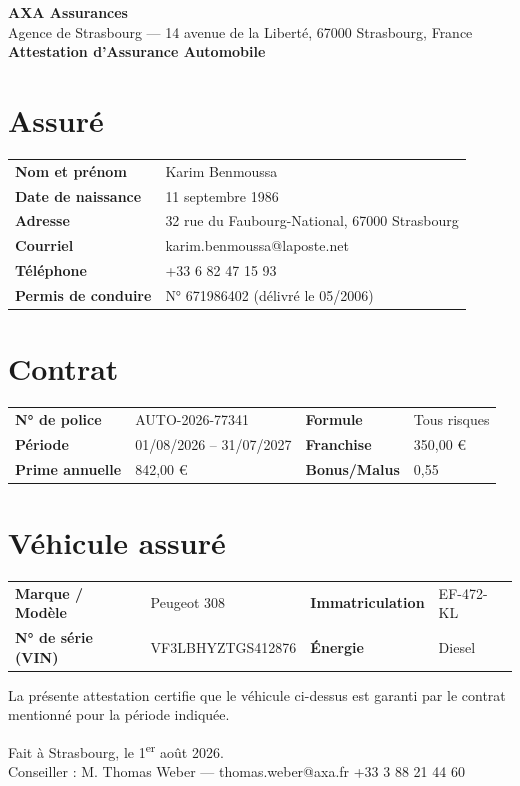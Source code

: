 \documentclass[11pt,a4paper]{article}
\begin{document}
{\Huge\bfseries\color{accent} AXA Assurances}\\[0.2em]
{\normalsize Agence de Strasbourg — 14 avenue de la Liberté, 67000 Strasbourg, France}\\[0.8em]
{\LARGE\bfseries Attestation d'Assurance Automobile}

\section{Assuré}
\begin{tabularx}{\linewidth}{@{}>{\bfseries}l X@{}}
Nom et prénom & Karim Benmoussa \\
Date de naissance & 11 septembre 1986 \\
Adresse & 32 rue du Faubourg-National, 67000 Strasbourg \\
Courriel & karim.benmoussa@laposte.net \\
Téléphone & +33 6 82 47 15 93 \\
Permis de conduire & N° 671986402 (délivré le 05/2006) \\
\end{tabularx}

\section{Contrat}
\begin{tabularx}{\linewidth}{@{}>{\bfseries}l X >{\bfseries}l X@{}}
N° de police & AUTO-2026-77341 & Formule & Tous risques \\
Période & 01/08/2026 -- 31/07/2027 & Franchise & 350,00 € \\
Prime annuelle & 842,00 € & Bonus/Malus & 0,55 \\
\end{tabularx}

\section{Véhicule assuré}
\begin{tabularx}{\linewidth}{@{}>{\bfseries}l X >{\bfseries}l X@{}}
Marque / Modèle & Peugeot 308 & Immatriculation & EF-472-KL \\
N° de série (VIN) & VF3LBHYZTGS412876 & Énergie & Diesel \\
\end{tabularx}

\vspace{1em}
La présente attestation certifie que le véhicule ci-dessus est garanti par le contrat
mentionné pour la période indiquée.

\vspace{1.2em}
Fait à Strasbourg, le 1\textsuperscript{er} août 2026.\\
Conseiller : M. Thomas Weber — thomas.weber@axa.fr \quad +33 3 88 21 44 60
\end{document}
